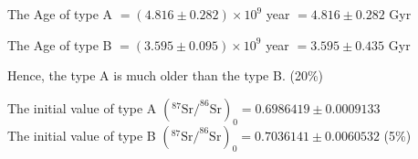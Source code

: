 \begin{description}
  The Age of type A ${}= (4.816 \pm 0.282) \times 10^{9}$ year
  ${}= 4.816 \pm 0.282$ Gyr

  The Age of type B ${}= (3.595 \pm 0.095) \times 10^{9}$ year
  ${}= 3.595 \pm 0.435$ Gyr %

  Hence, the type A is much older than the type B.
  \hfill(20\%)

\item[6.] The initial value of type A
  $\left(^{87}\mathrm{Sr}/^{86}\mathrm{Sr}\right)_0
    = 0.6986419 \pm 0.0009133$\\
  The initial value of type B
  $\left(^{87}\mathrm{Sr}/^{86}\mathrm{Sr}\right)_0
    = 0.7036141 \pm 0.0060532$
  \hfill(5\%)
\end{description}
